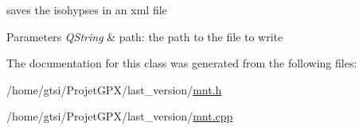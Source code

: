 saves the isohypses in an xml file 


\begin{DoxyParams}{Parameters}
{\em Q\+String} & path\+: the path to the file to write \\
\hline
\end{DoxyParams}


The documentation for this class was generated from the following files\+:\begin{DoxyCompactItemize}
\item 
/home/gtsi/\+Projet\+G\+P\+X/last\+\_\+version/\hyperlink{mnt_8h}{mnt.\+h}\item 
/home/gtsi/\+Projet\+G\+P\+X/last\+\_\+version/\hyperlink{mnt_8cpp}{mnt.\+cpp}\end{DoxyCompactItemize}
